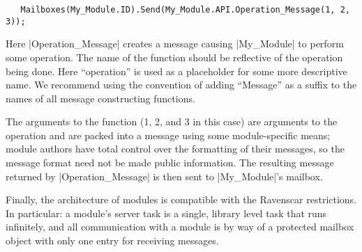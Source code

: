 \begin{lstlisting}
   Mailboxes(My_Module.ID).Send(My_Module.API.Operation_Message(1, 2, 3));
\end{lstlisting}

Here |Operation_Message| creates a message causing |My_Module| to perform some operation. The
name of the function should be reflective of the operation being done. Here ``operation'' is
used as a placeholder for some more descriptive name. We recommend using the convention of
adding ``Message'' as a suffix to the names of all message constructing functions.

The arguments to the function (1, 2, and 3 in this case) are arguments to the operation and are
packed into a message using some module-specific means; module authors have total control over
the formatting of their messages, so the message format need not be made public information.
 The resulting
message returned by |Operation_Message| is then sent to |My_Module|'s mailbox.

Finally, the architecture of modules is compatible with the Ravenscar restrictions. In
particular: a module's server task is a single, library level task that runs infinitely, and all
communication with a module is by way of a protected mailbox object with only one entry for
receiving messages.
